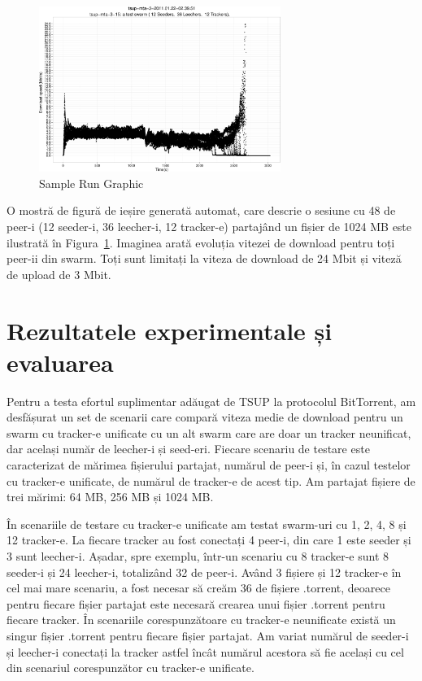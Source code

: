 \begin{figure}[h]
  \begin{center}
    \includegraphics[width=0.7\textwidth]{src/img/unified-tracker/tsup-sample-run-48peers}
  \end{center}
  \caption{Sample Run Graphic}
  \label{fig:unified-tracker:tsup-sample-run}
\end{figure}

O mostră de figură de ieșire generată automat, care descrie o sesiune cu 48 de peer-i (12 seeder-i, 36 leecher-i, 12 tracker-e) partajând un fișier de 1024 MB este ilustrată în Figura~\ref{fig:unified-tracker:tsup-sample-run}. Imaginea arată evoluția vitezei de download pentru toți peer-ii din swarm. Toți sunt limitați la viteza de download de 24 Mbit și viteză de upload de 3 Mbit.

\section{Rezultatele experimentale și evaluarea}
\label{sec:unified-tracker:results}

Pentru a testa efortul suplimentar adăugat de TSUP la protocolul BitTorrent, am desfășurat un set de scenarii care compară viteza medie de download pentru un swarm cu tracker-e unificate cu un alt swarm care are doar un tracker neunificat, dar același număr de leecher-i și seed-eri. Fiecare scenariu de testare este caracterizat de mărimea fișierului partajat, numărul de peer-i și, în cazul testelor cu tracker-e unificate, de numărul de tracker-e de acest tip. Am partajat fișiere de trei mărimi: 64 MB, 256 MB și 1024 MB.

În scenariile de testare cu tracker-e unificate am testat swarm-uri cu 1, 2, 4, 8 și 12 tracker-e. La fiecare tracker au fost conectați 4 peer-i, din care 1 este seeder și 3 sunt leecher-i. Așadar, spre exemplu, într-un scenariu cu 8 tracker-e sunt 8 seeder-i și 24 leecher-i, totalizând 32 de peer-i. Având 3 fișiere și 12 tracker-e în cel mai mare scenariu, a fost necesar să creăm 36 de fișiere .torrent, deoarece pentru fiecare fișier partajat este necesară crearea unui fișier .torrent pentru fiecare tracker. În scenariile corespunzătoare cu tracker-e neunificate există un singur fișier .torrent pentru fiecare fișier partajat. Am variat numărul de seeder-i și leecher-i conectați la tracker astfel încât numărul acestora să fie același cu cel din scenariul corespunzător cu tracker-e unificate.

